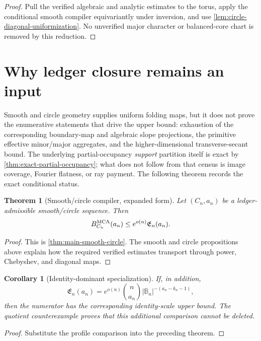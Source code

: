 \documentclass[12pt,a4paper]{amsart}
\numberwithin{equation}{section}
\newtheorem{theorem}{Theorem}[section]
\newtheorem{corollary}[corollary]{Corollary}
\theoremstyle{remark}
\newcommand{\B}{\mathbb B}
\newcommand{\abs}[1]{\lvert #1\rvert}
\begin{document}
\begin{proof}
Pull the verified algebraic and analytic estimates to the torus, apply the
conditional smooth compiler equivariantly under inversion, and use
\cref{lem:circle-diagonal-uniformization}.  No unverified major character
or balanced-core chart is removed by this reduction.
\end{proof}

\section{Why ledger closure remains an input}\label{sec:no-closed-hypothesis}

Smooth and circle geometry supplies uniform folding maps, but it does not
prove the enumerative statements that drive the upper bound: exhaustion of
the corresponding boundary-map and algebraic slope projections, the
primitive effective minor/major aggregates, and the higher-dimensional
transverse-secant bound.  The underlying partial-occupancy \emph{support}
partition itself is exact by \cref{thm:exact-partial-occupancy}; what does
not follow from that census is image coverage, Fourier flatness, or ray
payment.  The following theorem records the exact conditional status.

\begin{theorem}[Smooth/circle compiler, expanded form]\label{thm:smooth-circle-ledger-closure-expanded}
Let \((C_n,a_n)\) be a ledger-admissible smooth/circle sequence.  Then
\[
 B_{C_n}^{\rm MCA}(a_n)\le e^{o(n)}\mathfrak E_n(a_n).
\]
\end{theorem}

\begin{proof}
This is \cref{thm:main-smooth-circle}.  The smooth and
circle propositions above explain how the required verified estimates
transport through power, Chebyshev, and diagonal maps.
\end{proof}

\begin{corollary}[Identity-dominant specialization]\label{cor:final-no-ledger-assumption}
If, in addition,
\[
 \mathfrak E_n(a_n)=e^{o(n)}\binom n{a_n}
 \abs{\B_n}^{-(a_n-k_n-1)},
\]
then the numerator has the corresponding
identity-scale upper bound.  The quotient counterexample proves that this
additional comparison cannot be deleted.
\end{corollary}

\begin{proof}
Substitute the profile comparison into the preceding theorem.
\end{proof}
\end{document}
